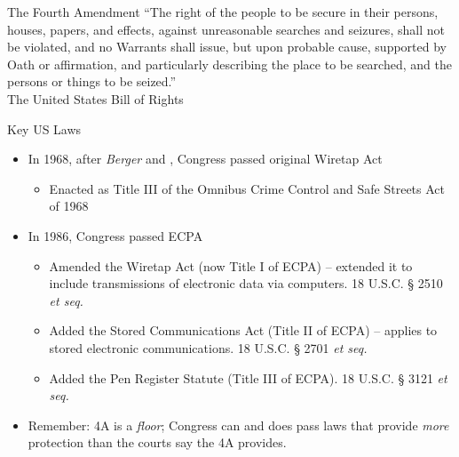 \documentclass[nobackground,dvipsnames,table]{beamer}
\begin{document}
\begin{frame}{The Fourth Amendment}
    “The right of the people to be secure in their  persons,  houses,  papers,  and effects,  against  unreasonable  searches and  seizures,  shall  not  be  violated,  and no  Warrants  shall  issue,  but  upon probable  cause,  supported  by  Oath  or affirmation,  and  particularly  describing the  place  to  be  searched,  and  the persons or things to be seized.”\\
    \small{The United States Bill of Rights}
\end{frame}

\begin{frame}{Key US Laws}
    \begin{itemize}
        \item In 1968, after \textit{Berger} and , Congress passed original Wiretap Act
        \begin{itemize}
            \item Enacted as Title III of the Omnibus Crime Control and Safe Streets Act of 1968
        \end{itemize}
        
        \item In 1986, Congress passed ECPA
        \begin{itemize}
            \item Amended the Wiretap Act (now Title I of ECPA) -- extended it to include transmissions of electronic data via computers. 18 U.S.C. § 2510 \textit{et seq.}
            \item Added the Stored Communications Act (Title II of ECPA) -- applies to stored electronic communications. 18 U.S.C. § 2701 \textit{et seq.}
            \item Added the Pen Register Statute (Title III of ECPA). 18 U.S.C. § 3121 \textit{et seq.}
        \end{itemize}

        \item Remember: 4A is a \textit{floor}; Congress can and does pass laws that provide \textit{more} protection than the courts say the 4A provides.
    \end{itemize}
\end{frame}
\end{document}
